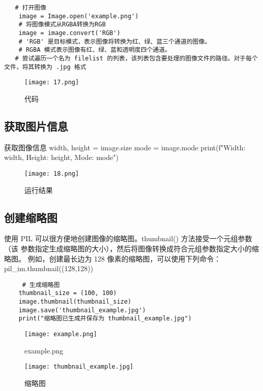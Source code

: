 \documentclass[a4paper, 12pt]{article}
\begin{document}
\begin{lstlisting}
   # 打开图像
    image = Image.open('example.png')
    # 将图像模式从RGBA转换为RGB
    image = image.convert('RGB')
    # 'RGB' 是目标模式，表示图像将转换为红、绿、蓝三个通道的图像。
    # RGBA 模式表示图像有红、绿、蓝和透明度四个通道。
   # 尝试遍历一个名为 filelist 的列表，该列表包含要处理的图像文件的路径。对于每个文件，将其转换为 .jpg 格式
\end{lstlisting}

\begin{figure}[H]
  \centering
    \texttt{[image: 17.png]}
  \caption{代码}
   \end{figure}  

\subsection{获取图片信息}
     获取图像信息
    width, height = image.size
    mode = image.mode
    print(f"Width: {width}, Height: {height},  Mode: {mode}")

\begin{figure}[H]
  \centering
    \texttt{[image: 18.png]}
  \caption{运行结果}
   \end{figure}  



\subsection{创建缩略图}
使用 PIL 可以很方便地创建图像的缩略图。thumbnail() 方法接受一个元组参数（该
参数指定生成缩略图的大小），然后将图像转换成符合元组参数指定大小的缩略图。
例如，创建最长边为 128 像素的缩略图，可以使用下列命令：
pil\_im.thumbnail((128,128))


\begin{verbatim}
     # 生成缩略图
    thumbnail_size = (100, 100)
    image.thumbnail(thumbnail_size)
    image.save('thumbnail_example.jpg')
    print("缩略图已生成并保存为 thumbnail_example.jpg")
  \end{verbatim}

\begin{figure}[H]
  \centering
    \texttt{[image: example.png]}
  \caption{example.png}
   \end{figure}  

   \begin{figure}[H]
  \centering
    \texttt{[image: thumbnail\_example.jpg]}
  \caption{缩略图}
   \end{figure}  
\end{document}
